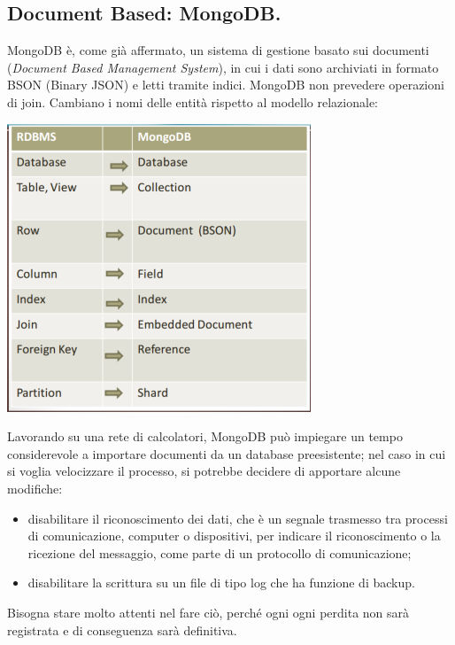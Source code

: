 \documentclass[a4page, 11pt]{article}
\begin{document}
\subsection{Document Based: MongoDB\cite{MongoDB, ScalingMongoDB}.}
MongoDB è, come già affermato, un sistema di gestione basato sui documenti (\textit{Document Based Management System}), in cui i dati sono archiviati in formato BSON (Binary JSON) e letti tramite indici.
MongoDB non prevedere operazioni di join.
Cambiano i nomi delle entità rispetto al modello relazionale:
\begin{center}
  \includegraphics[scale=0.6]{IMAGE2.jpg}
\end{center}

Lavorando su una rete di calcolatori, MongoDB può impiegare un tempo considerevole a importare documenti da un database preesistente; nel caso in cui si voglia velocizzare il processo, si potrebbe decidere di apportare alcune modifiche:
\begin{itemize}[noitemsep]
\item disabilitare il riconoscimento dei dati, che è un segnale trasmesso tra processi di comunicazione, computer o dispositivi, per indicare il riconoscimento o la ricezione del messaggio, come parte di un protocollo di comunicazione;
\item disabilitare la scrittura su un file di tipo log che ha funzione di backup.
\end{itemize}
Bisogna stare molto attenti nel fare ciò, perché ogni ogni perdita non sarà registrata e di conseguenza sarà definitiva.
\newline
\end{document}
